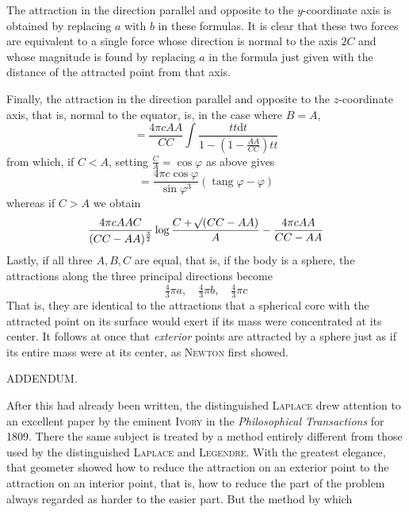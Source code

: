 \par
The attraction in the direction parallel and opposite to the $y$-coordinate axis is obtained by replacing $a$ with $b$ in these formulas. It is clear that these two forces are equivalent to a single force whose direction is normal to the axis $2C$ and whose magnitude is found by replacing $a$ in the formula just given with the distance of the attracted point from that axis.

Finally, the attraction in the direction parallel and opposite to the $z$-coordinate axis, that is, normal to the equator, is, in the case where $B=A$,
\[
=\frac{4\pi cAA}{CC}\int\frac{tt\mathrm{d}t}{1-(1-\frac{AA}{CC})tt}
\]
from which, if $C<A$, setting $\frac{C}{A}=\cos\varphi$ as above gives
\[
=\frac{4\pi c\cos\varphi}{\sin\varphi^3}(\operatorname{tang}\varphi-\varphi)
\]
whereas if $C>A$ we obtain
\[
\frac{4\pi cAAC}{(CC-AA)^{\frac32}}\log\frac{C+\mathord{{}^{}\!\surd}(CC-AA)}{A}-\frac{4\pi cAA}{CC-AA}
\]
Lastly, if all three $A,B,C$ are equal, that is, if the body is a sphere, the attractions along the three principal directions become
\[
\tfrac43\pi a,\quad\tfrac43\pi b,\quad\tfrac43\pi c
\]
That is, they are identical to the attractions that a spherical core with the attracted point on its surface would exert if its mass were concentrated at its center. It follows at once that \textit{exterior} points are attracted by a sphere just as if its entire mass were at its center, as \textsc{Newton} first showed.

\par\bigskip{}
\centerline{ADDENDUM.}\medskip
\par
After this had already been written, the distinguished \textsc{Laplace} drew attention to an excellent paper by the eminent \textsc{Ivory} in the \textit{Philosophical Transactions} for 1809. There the same subject is treated by a method entirely different from those used by the distinguished \textsc{Laplace} and \textsc{Legendre}. With the greatest elegance, that geometer showed how to reduce the attraction on an exterior point to the attraction on an interior point, that is, how to reduce the part of the problem always regarded as harder to the easier part. But the method by which
